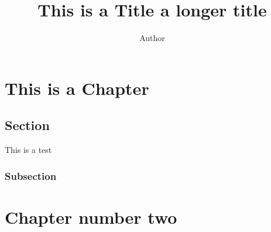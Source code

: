 \documentclass{pkStudyNotes}
\begin{document}
    \title{This is a Title  a longer title}
    \foreword{\lipsum[2] }
    \author{Author}
    \createTitle  
    \chapter{This is a Chapter}
    \section{Section}
   \lipsum[1]
   This is a test 
   \subsection{Subsection}
   \chapter{Chapter number two}
   \lipsum[2-5]

    
    
\end{document}
